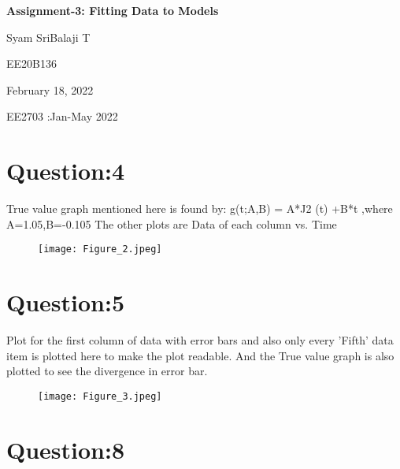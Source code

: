 \documentclass[12pt]{article}
\newcommand\titleofdoc{\textbf{Assignment-3: Fitting Data to Models}}
\begin{document}
\begin{titlepage}
   \begin{center}
        \vspace*{4cm} %

        \Huge{\titleofdoc} 

        \vspace{3 cm}
        \Large{Syam SriBalaji T}
       
        \vspace{0.25cm}
        \large{EE20B136}
       
        \vspace{3 cm}
        \Large{February 18, 2022}
        
        \vspace{0.25 cm}
        \Large{EE2703 :Jan-May 2022}
       

       \vfill
    \end{center}
\end{titlepage}

\setcounter{page}{2}
\pagestyle{fancy}
\fancyhf{}
\rhead{\thepage}

\section*{Question:4}

True value graph mentioned here is found by: g(t;A,B) = A*J2 (t) +B*t ,where A=1.05,B=-0.105 \linebreak 
The other plots are Data of each column vs. Time

\begin{figure}[h!]
\centering
\texttt{[image: Figure\_2.jpeg]}
\end{figure}

\newpage
\section*{Question:5}

Plot for the first column of data with error bars and also only every 'Fifth' data item is plotted here to make the plot readable. And the True value graph is also plotted to see the divergence in error bar.

\begin{figure}[h!]
\centering
\texttt{[image: Figure\_3.jpeg]}
\label{fig:exemplo}
\end{figure}

\newpage
\section*{Question:8}
\end{document}
